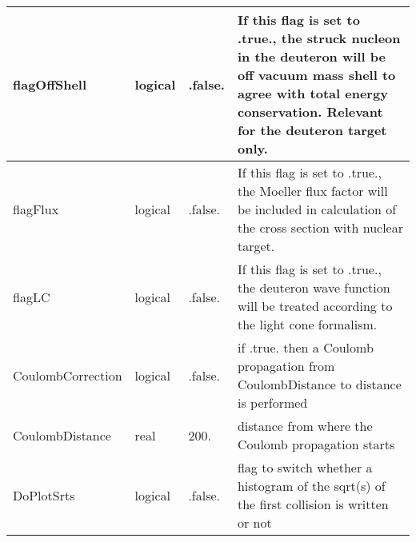 \documentclass{article}
\begin{document}
\begin{longtable}{llll}
\midrule
flagOffShell & \begin{minipage}[t]{2cm}logical\end{minipage} & \begin{minipage}[t]{2cm}.false.\end{minipage} & \begin{minipage}[t]{12cm}If this flag is set to .true., the struck nucleon in the deuteron will be off vacuum mass shell to agree with total energy conservation. Relevant for the deuteron target only.\end{minipage}\\*
\midrule
flagFlux & \begin{minipage}[t]{2cm}logical\end{minipage} & \begin{minipage}[t]{2cm}.false.\end{minipage} & \begin{minipage}[t]{12cm}If this flag is set to .true., the Moeller flux factor will be included in calculation of the cross section with nuclear target.\end{minipage}\\*
\midrule
flagLC & \begin{minipage}[t]{2cm}logical\end{minipage} & \begin{minipage}[t]{2cm}.false.\end{minipage} & \begin{minipage}[t]{12cm}If this flag is set to .true., the deuteron wave function will be treated according to the light cone formalism.\end{minipage}\\*
\midrule
CoulombCorrection & \begin{minipage}[t]{2cm}logical\end{minipage} & \begin{minipage}[t]{2cm}.false.\end{minipage} & \begin{minipage}[t]{12cm}if .true. then a Coulomb propagation from CoulombDistance to distance is performed\end{minipage}\\*
\midrule
CoulombDistance & \begin{minipage}[t]{2cm}real\end{minipage} & \begin{minipage}[t]{2cm}200.\end{minipage} & \begin{minipage}[t]{12cm}distance from where the Coulomb propagation starts\end{minipage}\\*
\midrule
DoPlotSrts & \begin{minipage}[t]{2cm}logical\end{minipage} & \begin{minipage}[t]{2cm}.false.\end{minipage} & \begin{minipage}[t]{12cm}flag to switch whether a histogram of the sqrt(s) of the first collision is written or not\end{minipage}\\*
\bottomrule
\end{longtable}
\end{document}
